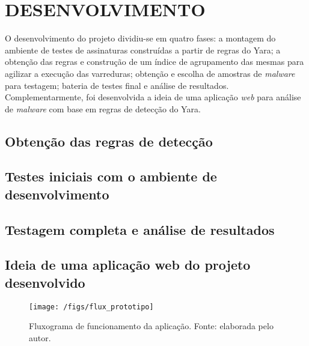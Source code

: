 \chapter{DESENVOLVIMENTO}
\label{c.Desenvolvimento}

O desenvolvimento do projeto dividiu-se em quatro fases: a montagem do ambiente de testes de assinaturas construídas a partir de regras do Yara; a obtenção das regras e construção de um índice de agrupamento das mesmas para agilizar a execução das varreduras; obtenção e escolha de amostras de \textit{malware} para testagem; bateria de testes final e análise de resultados. Complementarmente, foi desenvolvida a ideia de uma aplicação \textit{web} para análise de \textit{malware} com base em regras de detecção do Yara.

\section{Obtenção das regras de detecção}
\label{s.obtregras}


\section{Testes iniciais com o ambiente de desenvolvimento}
\label{s.testesiniciais}

\section{Testagem completa e análise de resultados}
\label{s.testefull}

\section{Ideia de uma aplicação web do projeto desenvolvido}
\label{s.prototipo}

\begin{figure}
  \texttt{[image: /figs/flux\_prototipo]}
  \caption{Fluxograma de funcionamento da aplicação. Fonte: elaborada pelo autor.}
  \label{f.flux_prototipo}
\end{figure}



